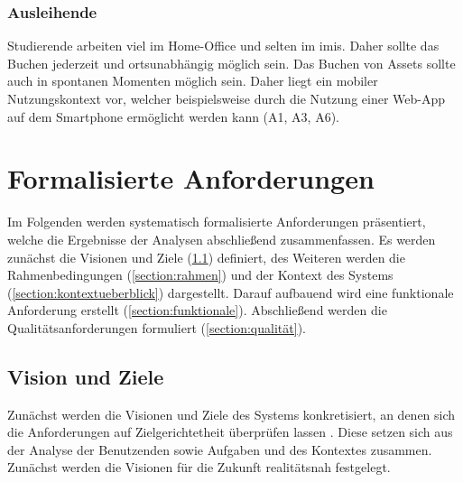 
\subsubsection{Ausleihende}
Studierende arbeiten viel im Home-Office und selten im \ac{imis}. Daher sollte
das Buchen jederzeit und ortsunabhängig möglich sein. Das Buchen von Assets
sollte auch in spontanen Momenten möglich sein. Daher liegt ein mobiler
Nutzungskontext vor, welcher beispielsweise durch die Nutzung einer Web-App auf
dem Smartphone ermöglicht werden kann (A1, A3, A6).


\section{Formalisierte Anforderungen}
\label{section:anforderung}

Im Folgenden werden systematisch formalisierte Anforderungen präsentiert, welche
die Ergebnisse der Analysen abschließend zusammenfassen. Es werden zunächst die
Visionen und Ziele (\ref{section:visionziel}) definiert, des Weiteren werden die
Rahmenbedingungen (\ref{section:rahmen}) und der Kontext des Systems
(\ref{section:kontextueberblick}) dargestellt. Darauf aufbauend wird eine
funktionale Anforderung erstellt (\ref{section:funktionale}). Abschließend
werden die Qualitätsanforderungen formuliert (\ref{section:qualität}).


\subsection{Vision und Ziele}
\label{section:visionziel}
Zunächst werden die Visionen und Ziele des Systems konkretisiert, an denen sich
die Anforderungen auf Zielgerichtetheit überprüfen lassen \cite{balzert2009}.
Diese setzen sich aus der Analyse der Benutzenden sowie Aufgaben und des
Kontextes zusammen. Zunächst werden die Visionen für die Zukunft realitätsnah
festgelegt.


